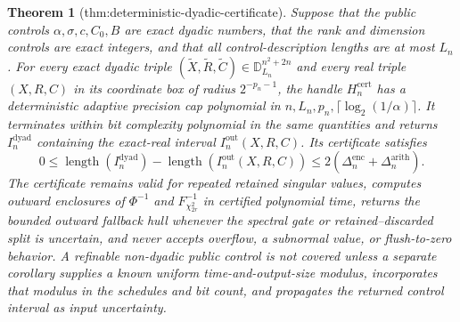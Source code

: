 \documentclass{article}
\newtheorem{theorem}{Theorem}
\begin{document}
\begin{theorem}[thm:deterministic-dyadic-certificate]\label{thm:deterministic-dyadic-certificate}
Suppose that the public controls \(\alpha,\sigma,c,C_0,B\) are exact dyadic numbers, that the rank and dimension controls are exact integers, and that all control-description lengths are at most \(L_n\).  For every exact dyadic triple \((\widetilde X,\widetilde R,\widetilde C)\in\mathbb D_{L_n}^{n^2+2n}\) and every real triple \((X,R,C)\) in its coordinate box of radius \(2^{-p_n-1}\), the handle \(H_n^{\mathrm{cert}}\) has a deterministic adaptive precision cap polynomial in \(n,L_n,p_n,\lceil\log_2(1/\alpha)\rceil\).  It terminates within bit complexity polynomial in the same quantities and returns \(I_n^{\mathrm{dyad}}\) containing the exact-real interval \(I_n^{\mathrm{out}}(X,R,C)\).  Its certificate satisfies
\[
0\le \operatorname{length}(I_n^{\mathrm{dyad}})
-\operatorname{length}(I_n^{\mathrm{out}}(X,R,C))
\le2(\Delta_n^{\mathrm{enc}}+\Delta_n^{\mathrm{arith}}).
\]
The certificate remains valid for repeated retained singular values, computes outward enclosures of \(\Phi^{-1}\) and \(F_{\chi^2_{2r}}^{-1}\) in certified polynomial time, returns the bounded outward fallback hull whenever the spectral gate or retained--discarded split is uncertain, and never accepts overflow, a subnormal value, or flush-to-zero behavior.  A refinable non-dyadic public control is not covered unless a separate corollary supplies a known uniform time-and-output-size modulus, incorporates that modulus in the schedules and bit count, and propagates the returned control interval as input uncertainty.
\end{theorem}
\end{document}

